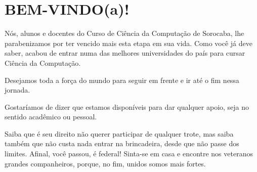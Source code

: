 \section{BEM-VINDO(a)!}

Nós, alunos e docentes do Curso de Ciência da Computação de Sorocaba, lhe parabenizamos por ter vencido mais esta etapa em sua vida. Como você já deve saber, acabou de entrar numa das melhores universidades do país para cursar Ciência da Computação. 

Desejamos toda a força do mundo para seguir em frente e ir até o fim nessa jornada.

Gostaríamos de dizer que estamos disponíveis para dar qualquer apoio, seja no sentido acadêmico ou pessoal.

Saiba que é seu direito não querer participar de qualquer trote, mas saiba também que não custa nada entrar na brincadeira, desde que não passe dos limites. Afinal, você passou, é federal! Sinta-se em casa e encontre nos veteranos grandes companheiros, porque, no fim, unidos somos mais fortes.
